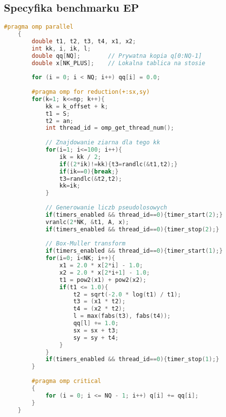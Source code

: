 \subsection{Specyfika benchmarku EP}
\begin{lstlisting}[language=C++, caption={Implementacja benchmarku EP w języku C++ z OpenMP}, label={lst:ep_openmp}]
    #pragma omp parallel
    {
        double t1, t2, t3, t4, x1, x2;
        int kk, i, ik, l;
        double qq[NQ];        // Prywatna kopia q[0:NQ-1]
        double x[NK_PLUS];    // Lokalna tablica na stosie
    
        for (i = 0; i < NQ; i++) qq[i] = 0.0;
    
        #pragma omp for reduction(+:sx,sy)
        for(k=1; k<=np; k++){
            kk = k_offset + k;
            t1 = S;
            t2 = an;
            int thread_id = omp_get_thread_num();
    
            // Znajdowanie ziarna dla tego kk
            for(i=1; i<=100; i++){
                ik = kk / 2;
                if((2*ik)!=kk){t3=randlc(&t1,t2);}
                if(ik==0){break;}
                t3=randlc(&t2,t2);
                kk=ik;
            }
    
            // Generowanie liczb pseudolosowych
            if(timers_enabled && thread_id==0){timer_start(2);}
            vranlc(2*NK, &t1, A, x);
            if(timers_enabled && thread_id==0){timer_stop(2);}
    
            // Box-Muller transform
            if(timers_enabled && thread_id==0){timer_start(1);}
            for(i=0; i<NK; i++){
                x1 = 2.0 * x[2*i] - 1.0;
                x2 = 2.0 * x[2*i+1] - 1.0;
                t1 = pow2(x1) + pow2(x2);
                if(t1 <= 1.0){
                    t2 = sqrt(-2.0 * log(t1) / t1);
                    t3 = (x1 * t2);
                    t4 = (x2 * t2);
                    l = max(fabs(t3), fabs(t4));
                    qq[l] += 1.0;
                    sx = sx + t3;
                    sy = sy + t4;
                }
            }
            if(timers_enabled && thread_id==0){timer_stop(1);}
        }
    
        #pragma omp critical
        {
            for (i = 0; i <= NQ - 1; i++) q[i] += qq[i];
        }
    }
\end{lstlisting}

